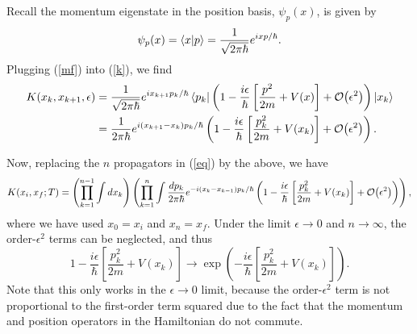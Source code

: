 \documentclass[12pt,a4paper]{article}
\begin{document}
Recall the momentum eigenstate in the position basis, $\psi_p(x)$, is given by
\begin{equation}
    \psi_p(x) = \braket{x}{p} = \frac{1}{\sqrt{2\pi\hbar}}e^{ixp/\hbar}.
    \label{mf}
\end{equation}
Plugging (\ref{mf}) into (\ref{k}), we find
\begin{equation}
    \begin{aligned}
        K(x_{k},x_{k+1},\epsilon) &= \frac{1}{\sqrt{2\pi\hbar}}e^{ix_{k+1}p_k/\hbar}\bra{p_k}\left(1-\frac{i\epsilon}{\hbar}\left[\frac{p^2}{2m} + V(x)\right] + \order{\epsilon^2}\right)\ket{x_{k}}\\
        &=\frac{1}{2\pi\hbar}e^{i(x_{k+1}-x_k)p_k/\hbar}\left(1 -\frac{i\epsilon}{\hbar}\left[\frac{p_k^2}{2m} + V(x_k)\right] + \order{\epsilon^2} \right).
    \end{aligned}
\end{equation}

Now, replacing the $n$ propagators in (\ref{eq}) by the above, we have
\begin{equation}
    K(x_i,x_f;T) = \left(\prod_{k=1}^{n-1}\int dx_k\right)\left(\prod_{k=1}^{n}\int \frac{dp_k}{2\pi\hbar}e^{-i(x_{k}-x_{k-1})p_k/\hbar}\left(1 -\frac{i\epsilon}{\hbar}\left[\frac{p_k^2}{2m} + V(x_k)\right] + \order{\epsilon^2}\right)\right),
\end{equation}
where we have used $x_0 = x_i$ and $x_n=x_f$.
Under the limit $\epsilon \to 0$ and $n \to \infty$, the order-$\epsilon^2$ terms can be neglected, and thus
\begin{equation}
    1 -\frac{i\epsilon}{\hbar}\left[\frac{p_k^2}{2m} + V(x_k)\right] \to \exp\left(-\frac{i\epsilon}{\hbar}\left[\frac{p_k^2}{2m} + V(x_k)\right]\right).
\end{equation}
Note that this only works in the $\epsilon \to 0$ limit, because the order-$\epsilon^2$ term is not proportional to the first-order term squared due to the fact that the momentum and position operators in the Hamiltonian do not commute.
\end{document}
